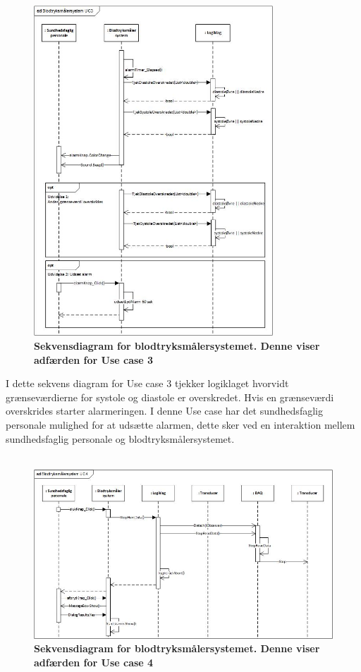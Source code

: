 \begin{figure}[H]
\includegraphics[width =0.8\textwidth , center]{billeder/sdUC3}
\caption{\textbf{Sekvensdiagram for blodtryksmålersystemet. Denne viser adfærden for Use case 3}}
\end{figure}
I dette sekvens diagram for Use case 3 tjekker logiklaget hvorvidt grænseværdierne for systole og diastole er overskredet. Hvis en grænseværdi overskrides starter alarmeringen. I denne Use case har det sundhedsfaglig personale mulighed for at udsætte alarmen, dette sker ved en interaktion mellem sundhedsfaglig personale og blodtryksmålersystemet.\\\\ 
\begin{figure}[H]
\includegraphics[width =1.0\textwidth , center]{billeder/sdUC4}
\caption{\textbf{Sekvensdiagram for blodtryksmålersystemet. Denne viser adfærden for Use case 4}}
\end{figure}
